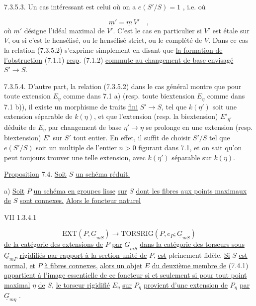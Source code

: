 7.3.5.3. Un cas intéressant est celui où on a $e(S'/S) = 1$ , i.e. où

\begin{equation*}
\underline{m}' = \underline{m}\, V' \quad ,
\end{equation*}
où $\underline{m}'$ désigne l'idéal maximal de $V'$. C'est le cas en particulier si $V'$ est étale sur $V$, ou si c'est le hensélisé, ou le hensélisé strict, ou le complété de $V$. Dans ce cas la relation (7.3.5.2) s'exprime simplement en disant que \underline{la formation de l'obstruction} (7.1.1) \underline{resp}. (7.1.2) \underline{commute au changement de base envisagé} $S' \longrightarrow S$.

7.3.5.4. D'autre part, la relation (7.3.5.2) dans le cas général montre que pour toute extension $E_\eta$ comme dans 7.1 a) (resp. toute biextension $E_\eta$ comme dans 7.1 b)), il existe un morphisme de traits \underline{fini} $S' \longrightarrow S$,
tel que $k(\eta')$ soit une extension séparable de $k(\eta)$, et que l'extension (resp. la biextension) $E'_{\eta'}$ déduite de $E_{\eta}$ par changement de base $\eta' \longrightarrow \eta$ se prolonge en une extension (resp. biextension) $E'$ sur $S'$ tout entier. En effet, il suffit de choisir $S'/S$ tel que $e(S'/S)$ soit un multiple de l'entier $n > 0$ figurant dans 7.1, et on sait qu'on peut toujours trouver une telle extension, avec $k(\eta')$ séparable sur $k(\eta)$.


\underline{Proposition} 7.4. \underline{Soit} $S$ \underline{un schéma réduit.}

a) \underline{Soit} $P$ \underline{un schéma en groupes lisse} \underline{sur} $S$ \underline{dont les fibres aux points maximaux de} $S$ \underline{sont connexes.} \underline{Alors le foncteur naturel}

VII 1.3.4.1

\begin{equation}\tag{7.4.1}
\mathrm{EXT}(P,\underline{G}_{mS}) \longrightarrow \mathrm{TORSRIG}(P,e_P;\underline{G}_{mS})
\end{equation}
\underline{de la catégorie des extensions de} $P$ \underline{par} $\underline{G}_{mS}$ \underline{dans la catégorie des torseurs sous} $\underline{G}_{mP}$ \underline{rigidifiés par rapport à la section unité de} $P$, \underline{est} pleinement fidèle. \underline{Si} $S$ \underline{est normal}, \underline{et} $P$ \underline{à fibres connexes}, \underline{alors un objet} $E$ \underline{du deuxième membre de} (7.4.1) \underline{appartient à l'image essentielle de ce foncteur si et seulement si pour tout point maximal} $\eta$ \underline{de} $S$, \underline{le torseur rigidifié} $E_{\eta}$ \underline{sur} $P_{\eta}$ \underline{provient d'une extension de} $P_{\eta}$ \underline{par} $\underline{G}_{m\eta}$ .

